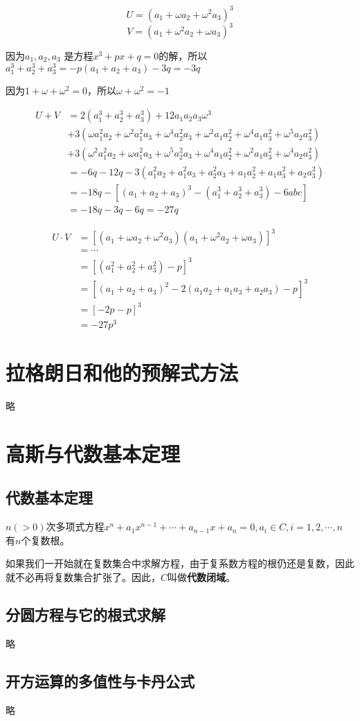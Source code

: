 \documentclass[12pt]{article}
\begin{document}
\begin{framed}  
\small{
$$
U = (a_1 + \omega a_2 + \omega^2 a_3)^3
$$
$$
V = (a_1 + \omega^2 a_2 + \omega a_3)^3
$$

因为$a_1, a_2, a_3$ 是方程$x^3+px+q=0$的解，所以$
a_1^3 + a_2^3+a_3^3 = -p(a_1+a_2+a_3)-3q = -3q$

因为$1 + \omega + \omega^2 = 0$，所以$\omega + \omega^2 = -1$

\begin{align*}
U + V &= 2(a_1^3 + a_2^3+a_3^3) + 12a_1a_2a_3\omega^3 \\
&+ 3(\omega a_1^2a_2
+ \omega^2a_1^2a_3 + \omega^4 a_2^2a_3 + \omega^2a_1a_2^2 + \omega^4a_1a_3^2 + \omega^5a_2a_3^2) \\
&+ 3(\omega^2 a_1^2a_2
+ \omega a_1^2a_3 + \omega^5 a_2^2a_3 + \omega^4a_1a_2^2 + \omega^2a_1a_3^2 + \omega^4a_2a_3^2) \\
&= -6q - 12q - 3(a_1^2a_2 + a_1^2a_3 + a_2^2a_3 + a_1a_2^2 + a_1a_3^2 + a_2a_3^2) \\
&= -18q - [(a_1+a_2+a_3)^3-(a_1^3+a_2^3+a_3^3) - 6abc] \\
&= -18q - 3q - 6q = -27q
\end{align*}

\begin{align*}
U \cdot V &= [(a_1+\omega a_2+\omega^2a_3)(a_1 + \omega^2a_2 + \omega a_3)]^3 \\
&= \cdots \\
&= [(a_1^2+a_2^2+a_3^2) - p]^3 \\
&= [(a_1+a_2+a_3)^2 - 2(a_1a_2 + a_1a_3 + a_2a_3) - p]^3 \\
&= [-2p - p]^3 \\
&= -27p^3
\end{align*}
}
\end{framed}

\section{拉格朗日和他的预解式方法}
略

\section{高斯与代数基本定理}
\subsection{代数基本定理}
$n(>0)$次多项式方程$x^n + a_1x^{n-1} + \cdots + a_{n-1}x + a_n = 0, a_i \in C, i = 1, 2, \cdots, n$ 有$n$个复数根。

如果我们一开始就在复数集合中求解方程，由于复系数方程的根仍还是复数，因此就不必再将复数集合扩张了。因此，$C$叫做\textbf{代数闭域}。

\subsection{分圆方程与它的根式求解}
略

\subsection{开方运算的多值性与卡丹公式}
略




\end{document}
